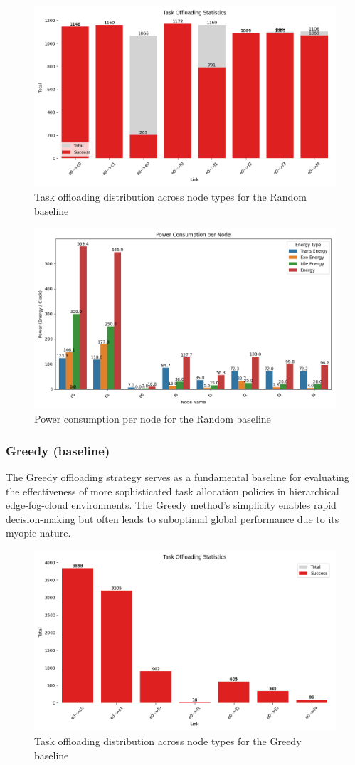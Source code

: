 \documentclass[preprint,3p,authoryear]{elsarticle}
\begin{document}
\begin{figure}[H]
    \centering
    \includegraphics[width=0.5\linewidth]{figs/Random/task_offloading_statistics.png}
    \caption{Task offloading distribution across node types for the Random baseline}
    \label{fig:random-task-offloading-stats}
\end{figure}

\begin{figure}[H]
    \centering
    \includegraphics[width=0.5\linewidth]{figs/Random/power_consumption_per_node.png}
    \caption{Power consumption per node for the Random baseline}
    \label{fig:random-power-consumption}
\end{figure}



\subsubsection{Greedy (baseline)}
\label{subsec:greedy-baseline}

The Greedy offloading strategy serves as a fundamental baseline for evaluating the effectiveness of more sophisticated task allocation policies in hierarchical edge-fog-cloud environments. The Greedy method's simplicity enables rapid decision-making but often leads to suboptimal global performance due to its myopic nature. 


\begin{figure}[H]
    \centering
    \includegraphics[width=0.5\linewidth]{figs/Greedy/task_offloading_statistics.png}
    \caption{Task offloading distribution across node types for the Greedy baseline}
    \label{fig:greedy-task-offloading-stats}
\end{figure}
\end{document}
